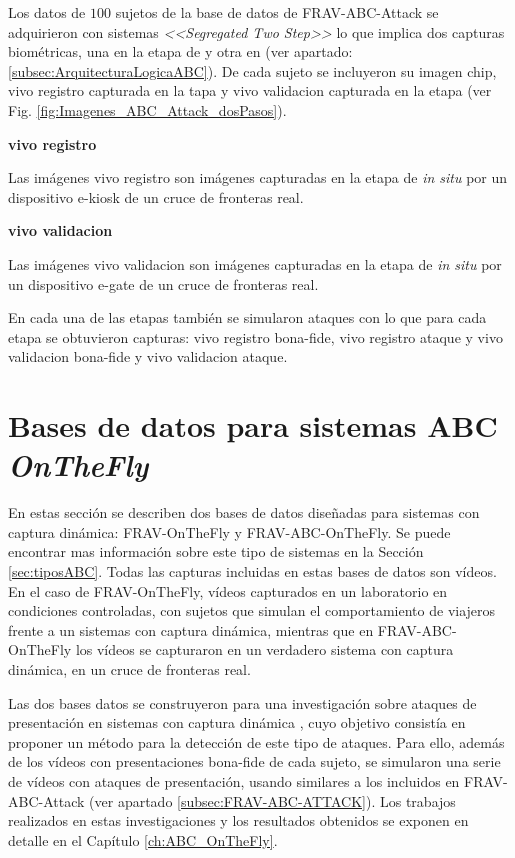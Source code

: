 Los datos de $100$ sujetos de la base de datos de \Gls{FRAV-ABC-Attack} se adquirieron con sistemas  \textit{<<Segregated Two Step>>} lo que implica dos capturas biométricas, una en la etapa de  y otra en  (ver apartado: \ref{subsec:ArquitecturaLogicaABC}). De cada sujeto se incluyeron su imagen \gls{chip}, \gls{vivo registro} capturada en la tapa  y \gls{vivo validacion} capturada en la etapa  (ver Fig. \ref{fig:Imagenes_ABC_Attack_dosPasos}).

\medskip
\textbf{\gls{vivo registro}}

Las imágenes \gls{vivo registro} son imágenes capturadas en la etapa de  \textit{in situ} por un dispositivo \gls{e-kiosk} de un cruce de fronteras real.

\medskip
\textbf{\gls{vivo validacion}}

Las imágenes \gls{vivo validacion} son imágenes capturadas en la etapa de  \textit{in situ} por un dispositivo \gls{e-gate} de un cruce de fronteras real.
\medskip

En cada una de las etapas también se simularon ataques con lo que para cada etapa se obtuvieron capturas: \gls{vivo registro bona-fide}, \gls{vivo registro ataque} y \gls{vivo validacion bona-fide} y \gls{vivo validacion ataque}.

\section{Bases de datos para sistemas ABC \textit{OnTheFly}}\label{sec:BBDD-OnTheFly}

En estas sección se describen dos bases de datos diseñadas para sistemas  con captura dinámica: \Gls{FRAV-OnTheFly} y \Gls{FRAV-ABC-OnTheFly}. Se puede encontrar mas información sobre este tipo de sistemas en la Sección \ref{sec:tiposABC}. Todas las capturas incluidas en estas bases de datos son vídeos. En el caso de \Gls{FRAV-OnTheFly}, vídeos capturados en un laboratorio en condiciones controladas, con sujetos que simulan el comportamiento de viajeros frente a un sistemas  con captura dinámica, mientras que en \Gls{FRAV-ABC-OnTheFly} los vídeos se capturaron en un verdadero sistema  con captura dinámica, en un cruce de fronteras real.

Las dos bases datos se construyeron para una investigación sobre ataques de presentación en sistemas  con captura dinámica \cite{ortega2020dynamic}, cuyo objetivo consistía en proponer un método para la detección de este tipo de ataques. Para ello, además de los vídeos con presentaciones \gls{bona-fide} de cada sujeto, se simularon una serie de vídeos con ataques de presentación, usando  similares a los incluidos en \Gls{FRAV-ABC-Attack} (ver apartado \ref{subsec:FRAV-ABC-ATTACK}). Los trabajos realizados en estas investigaciones y los resultados obtenidos se exponen en detalle en el Capítulo \ref{ch:ABC_OnTheFly}.

